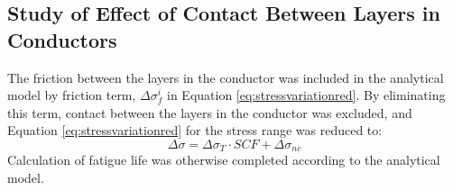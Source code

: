 \subsection{Study of Effect of Contact Between Layers in Conductors}
The friction between the layers in the conductor was included in the analytical model by friction term, $\Delta \sigma_f^i$ in Equation \ref{eq:stressvariationred}. By eliminating this term, contact between the layers in the conductor was excluded, and  Equation \ref{eq:stressvariationred} for the stress range was reduced to:
\begin{equation}
    \Delta \sigma=\Delta \sigma_T \cdot SCF + \Delta \sigma_{nc}
\end{equation}
Calculation of fatigue life was otherwise completed according to the analytical model.




